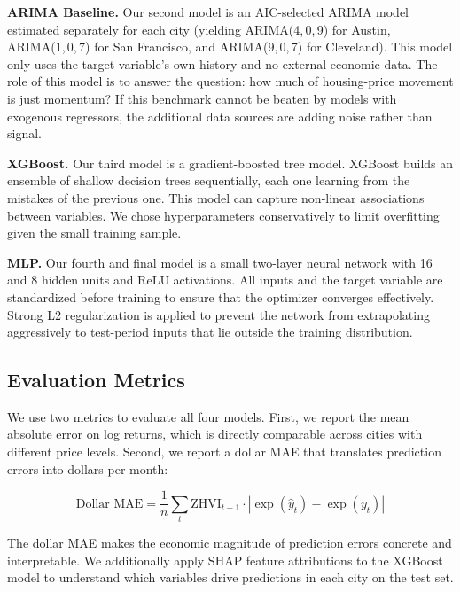 \textbf{ARIMA Baseline.} Our second model is an AIC-selected ARIMA model estimated separately for each city (yielding ARIMA(4,\,0,\,9) for Austin, ARIMA(1,\,0,\,7) for San Francisco, and ARIMA(9,\,0,\,7) for Cleveland). This model only uses the target variable's own history and no external economic data. The role of this model is to answer the question: how much of housing-price movement is just momentum? If this benchmark cannot be beaten by models with exogenous regressors, the additional data sources are adding noise rather than signal.

\textbf{XGBoost.} Our third model is a gradient-boosted tree model. XGBoost builds an ensemble of shallow decision trees sequentially, each one learning from the mistakes of the previous one. This model can capture non-linear associations between variables. We chose hyperparameters conservatively to limit overfitting given the small training sample.

\textbf{MLP.} Our fourth and final model is a small two-layer neural network with 16 and 8 hidden units and ReLU activations. All inputs and the target variable are standardized before training to ensure that the optimizer converges effectively. Strong L2 regularization is applied to prevent the network from extrapolating aggressively to test-period inputs that lie outside the training distribution.

\subsection{Evaluation Metrics}

We use two metrics to evaluate all four models. First, we report the mean absolute error on log returns, which is directly comparable across cities with different price levels. Second, we report a dollar MAE that translates prediction errors into dollars per month:

$$\text{Dollar MAE} = \frac{1}{n}\sum_{t} \text{ZHVI}_{t-1} \cdot
|\exp(\hat{y}_t) - \exp(y_t)|$$

The dollar MAE makes the economic magnitude of prediction errors concrete and interpretable. We additionally apply SHAP feature attributions to the XGBoost model to understand which variables drive predictions in each city on the test set.

